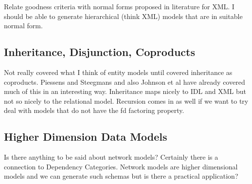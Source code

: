Relate goodness criteria with  normal forms proposed in literature for XML. I should be able to generate hierarchical
(think XML) models that are in suitable normal form.

\subsection{Inheritance, Disjunction, Coproducts}
Not really covered what I think of entity models until covered inheritance as coproducts.
Piessens and Steegmans and also Johnson et al have already covered much of this in an interesting way. 
Inheritance maps nicely to IDL and XML but not so nicely to the relational model.  Recursion comes in as well if we want to try deal with models that do not have the fd factoring property.

\subsection{Higher Dimension Data Models}
Is there anything to be said about network models? Certainly there is a connection to Dependency Categories.
Network models are higher dimensional models and we can generate such schemas but is there a practical application?  
 
